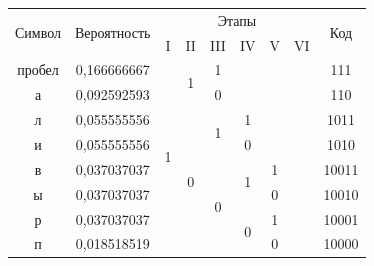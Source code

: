 \documentclass[a4paper,14pt]{extarticle}
\begin{document}
\begin{center}
    \begin{tabular}{|c|c|c|c|c|c|c|c|c|}
        \hline
        \multirow{2}{*}{Символ} & \multirow{2}{*}{Вероятность} & \multicolumn{6}{|c|}{Этапы} & \multirow{2}{*}{Код}                                                                              \\
        \cline{3-8}
                                &                              & I                           & II                   & III                & IV                 & V                  & VI &        \\
        \hline
        пробел                  & 0,166666667                  & \multirow{8}{*}{1}          & \multirow{2}{*}{1}   & 1                  &                    &                    &    & 111    \\
        \cline{1-2} \cline{5-9}
        а                       & 0,092592593                  &                             &                      & 0                  &                    &                    &    & 110    \\
        \cline{1-2} \cline{4-9}
        л                       & 0,055555556                  &                             & \multirow{6}{*}{0}   & \multirow{2}{*}{1} & 1                  &                    &    & 1011   \\
        \cline{1-2} \cline{6-9}
        и                       & 0,055555556                  &                             &                      &                    & 0                  &                    &    & 1010   \\
        \cline{1-2} \cline{5-9}
        в                       & 0,037037037                  &                             &                      & \multirow{4}{*}{0} & \multirow{2}{*}{1} & 1                  &    & 10011  \\
        \cline{1-2} \cline{7-9}
        ы                       & 0,037037037                  &                             &                      &                    &                    & 0                  &    & 10010  \\
        \cline{1-2} \cline{6-9}
        р                       & 0,037037037                  &                             &                      &                    & \multirow{2}{*}{0} & 1                  &    & 10001  \\
        \cline{1-2} \cline{7-9}
        п                       & 0,018518519                  &                             &                      &                    &                    & 0                  &    & 10000  \\

\end{tabular}
\end{center}
\end{document}
